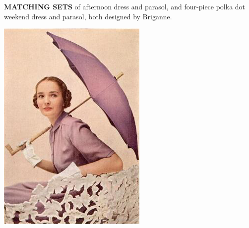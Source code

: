 \begin{minipage}{1.05\textwidth}
{\begin{minipage}[t]{0.87\textwidth}
\begin{minipage}[t]{0.4\textwidth}
\noindent \footnotesize\textbf{MATCHING SETS} of afternoon dress
and parasol, and four-piece polka dot weekend dress and parasol,
both designed by Briganne.
\end{minipage}
\end{minipage}
}

\vfill

\end{minipage}




\begin{minipage}{\textwidth}
\begin{minipage}[b][\textheight][b]{.47\linewidth}
\vspace*{2cm}

\includegraphics[width=\linewidth]{./images/parasol-03.jpg}\par
\vspace{2\baselineskip}


\end{minipage}
\end{minipage}
